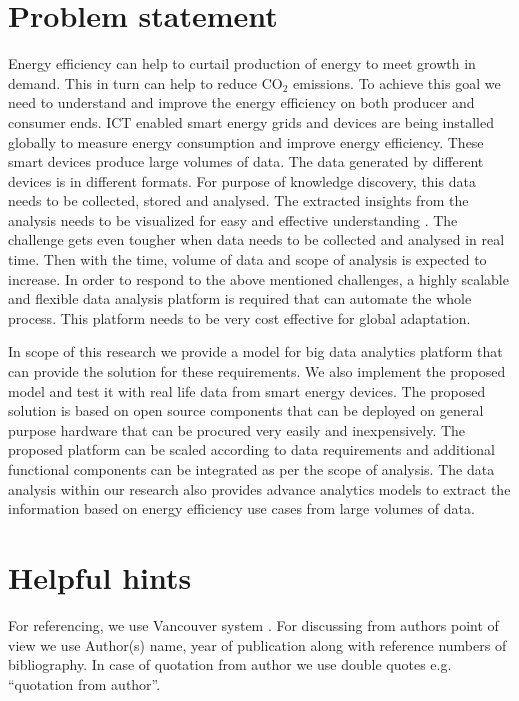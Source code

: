 \section{Problem statement}

Energy efficiency can help to curtail production of energy to meet growth in demand. This in turn can help to reduce CO\(_{2}\) emissions. To achieve this goal we need to understand and improve the energy efficiency on both producer and consumer ends. ICT enabled smart energy grids and devices are being installed globally to measure energy consumption and improve energy efficiency. These smart devices produce large volumes of data. The data generated by different devices is in different formats. For purpose of knowledge discovery, this data needs to be collected, stored and analysed. The extracted insights from the analysis needs to be visualized for easy and effective understanding . The challenge gets even tougher when data needs to be collected and analysed in real time. Then with the time, volume of data and scope of analysis is expected to increase. In order to respond to the above mentioned challenges, a highly scalable and flexible data analysis platform is required that can automate the whole process. This platform needs to be very cost effective for global adaptation.
 
In scope of this research we provide a model for big data analytics platform that can provide the solution for these requirements. We also implement the proposed model and test it with real life data from smart energy devices. The proposed solution is based on open source components that can be deployed on general purpose hardware that can be procured very easily and inexpensively. The proposed platform can be scaled according to data requirements and additional functional components can be integrated as per the scope of analysis. The data analysis within our research also provides advance analytics models to extract the information based on energy efficiency use cases from large volumes of data.


\section{Helpful hints}

For referencing, we use Vancouver system \cite{neville2012referencing}. For discussing from authors point of view we use Author(s) name, year of publication along with reference numbers of bibliography. In case of quotation from author we use double quotes e.g. ``quotation from author''.

